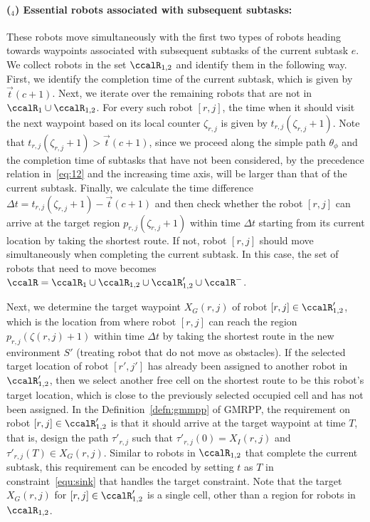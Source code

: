 \documentclass[Afour,sageh,times]{sagej}
\newcounter{mycounter}
\begin{document}
{{ \paragraph{($_4$) Essential robots associated with subsequent subtasks:} These robots move simultaneously with the first two types of robots heading towards  waypoints associated with subsequent subtasks of the current subtask $e$. We collect robots in the set $\ccalR_{1,2}$ and identify them in the following way. First, we identify the completion time  of the current subtask, which is given by $\vec{t}(c+1)$.  Next, we iterate over the remaining robots that are not in $\ccalR_1 \cup \ccalR_{1,2}$. For every such robot $[r,j]$, the time when it should visit the next waypoint based on its local counter $\zeta_{r,j}$ is given by $t_{r,j}(\zeta_{r,j}+1)$. Note that {$t_{r, j}(\zeta_{r,j}+1) > \vec{t}(c+1)$}, since we proceed along the simple path $\theta_{\phi}$ and the completion time of  subtasks that have not been considered, by the precedence relation in~\eqref{eq:12} and the increasing time axis, will be larger than that of the current subtask. Finally, we calculate the time difference $\Delta t = t_{r, j}(\zeta_{r,j}+1) - \vec{t}(c+1)$  and then check whether the robot $[r, j]$ can arrive at the target region $p_{r,j}(\zeta_{r,j}+1)$  within time $\Delta t$ starting from  its current location by taking the shortest route. {If not, robot $[r, j]$ should move simultaneously when completing the current subtask.} In this case, the set of robots that need to move becomes $\ccalR = \ccalR_1 \cup \ccalR_{1,2} \cup \ccalR'_{1,2}\cup \ccalR^-$.

 Next, we determine the target waypoint $X_G(r,j)$ of robot $[r,j] \in \ccalR'_{1,2}$, which is the  location from where robot $[r,j]$ can reach the region $p_{r,j}(\zeta(r,j)+1)$ within time $\Delta t$ by taking the shortest route in the new environment $S'$ (treating robot that do not move as obstacles). If the selected target location of robot $[r',j']$ has already been assigned to another robot in $\ccalR'_{1,2}$, then we select another free cell on the shortest route to be this robot's target location, which is close to the previously selected occupied cell and has not been assigned. In the Definition~\ref{defn:gmmpp} of GMRPP, the requirement on robot $[r,j] \in \ccalR'_{1,2}$ is that it should arrive at the target waypoint at time $T$, that is, design the path $\tau'_{r,j}$ such that $\tau'_{r,j}(0) = X_I(r,j)$ and $\tau'_{r,j}(T) \in X_G(r,j)$.  Similar to robots in $\ccalR_{1,2}$ that complete the current subtask, this requirement can be encoded by setting $t$ as $T$ in constraint~\eqref{equ:sink} that handles the target constraint. Note that the target $X_G(r,j)$ for $[r,j] \in \ccalR_{1,2}'$ is a single cell, other than a region for robots in $\ccalR_{1,2}$.
}}
\end{document}
